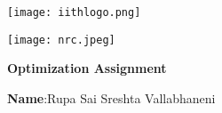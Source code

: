 \documentclass[10pt,a4paper]{report}
\begin{document}
\begin{figure*}[!tbp]
  \centering
  \begin{minipage}[b]{0.4\textwidth}
   \texttt{[image: iithlogo.png]} 
  \end{minipage}
  \hfill
  \vspace{5mm}\begin{minipage}[b]{0.4\textwidth}
\raggedleft \texttt{[image: nrc.jpeg]} 
  \end{minipage}\vspace{0.2cm}
\end{figure*}
\raggedright 
\begin{center}
\Large \textbf{Optimization Assignment}\hspace{2.5cm} %
\end{center}
\begin{center}
\hspace{0.5cm}
\textbf{Name}:\hspace{2mm}Rupa Sai Sreshta Vallabhaneni\hspace{1cm}
\date{25-September-2022}
\end{center}
\end{document}
